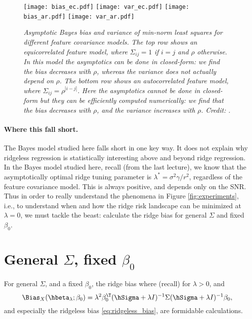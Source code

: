 \documentclass{article}
\begin{document}
\begin{figure}[p]
\centering
\texttt{[image: bias\_ec.pdf]}
\texttt{[image: var\_ec.pdf]}
\texttt{[image: bias\_ar.pdf]}
\texttt{[image: var\_ar.pdf]}
\caption{\it Asymptotic Bayes bias and variance of min-norm least squares for
  different feature covariance models. The top row shows an equicorrelated
  feature model, where $\Sigma_{ij} = 1$ if $i=j$ and $\rho$ otherwise. In this 
  model the asymptotics can be done in closed-form: we find the bias decreases
  with $\rho$, whereas the variance does not actually depend on $\rho$. The
  bottom row shows an autocorrelated feature model, where $\Sigma_{ij} = 
  \rho^{|i-j|}$. Here the asymptotics cannot be done in closed-form but they can  
  be efficiently computed numerically: we find that the bias decreases with
  $\rho$, and the variance increases with $\rho$. Credit:
  \citet{hastie2022surprises}.}      
\label{fig:risk_ec_ar}
\end{figure}

\paragraph{Where this fall short.}

The Bayes model studied here falls short in one key way. It does not explain why
ridgeless regression is statistically interesting above and beyond ridge
regression. In the Bayes model studied here, recall (from the last lecture), we
know that the asymptotically optimal ridge tuning parameter is $\lambda^* =
\sigma^2 \gamma / r^2$, regardless of the feature covariance model. This is
always positive, and depends only on the SNR. Thus in order to really understand
the phenomena in Figure \ref{fig:experiments}, i.e., to understand when and how
the ridge risk landscape can be minimized at $\lambda = 0$, we must tackle the
beast: calculate the ridge bias for general $\Sigma$ and fixed $\beta_0$.     

\section{General $\Sigma$, fixed $\beta_0$}

For general $\Sigma$, and a fixed $\beta_0$, the ridge bias where (recall)
 for $\lambda>0$,
and  
\begin{equation}
\label{eq:ridge_bias}
\Bias_X(\hbeta_\lambda; \beta_0) = \lambda^2 \beta_0^\T (\hSigma + \lambda
I)^{-1} \Sigma (\hSigma + \lambda I)^{-1} \beta_0,
\end{equation}
and especially the ridgeless bias \eqref{eq:ridgeless_bias}, are formidable 
calculations.   
\end{document}
